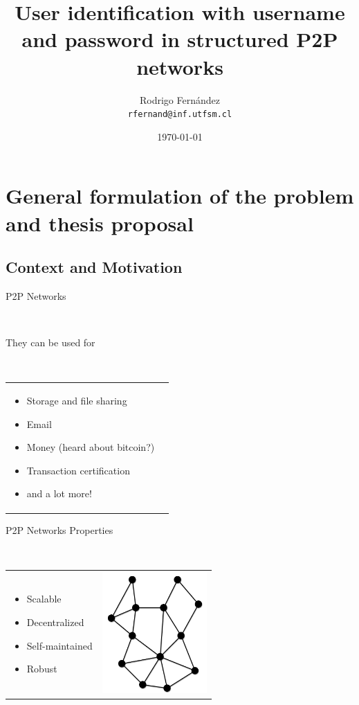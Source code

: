 \documentclass[12pt]{beamer}
\title{User identification with username and password in structured P2P networks}
\subtitle{}
\author[R. Fernández]{Rodrigo Fernández \\ \small{\texttt{rfernand@inf.utfsm.cl}}}
\institute[]{Universidad Técnica Federico Santa María}
\date{\today}
\renewcommand{\frametitle}[1]{\vspace{0.2cm}\begin{huge}#1\end{huge}\\}
\renewcommand{\framesubtitle}[1]{\vspace{0.4cm} \hspace{0.4cm}\begin{large}#1\end{large}\\}
\begin{document}
  

  \frame{\titlepage}
  \frame{\tableofcontents}

  \section{General formulation of the problem and thesis proposal}
  \subsection{Context and Motivation}

  \begin{frame}
  \frametitle{P2P Networks}
  \framesubtitle{They can be used for}
  
  \begin{table}
  \begin{tabular}{p{7cm}p{3cm}}
  \begin{itemize}
    \item Storage and file sharing
    \item Email
    \item Money (heard about bitcoin?)
    \item Transaction certification
    \item and a lot more!
  \end{itemize}
  &
  \vspace{1.5cm}
  \end{tabular}
  \end{table}
  \end{frame}

    \begin{frame}
    \frametitle{P2P Networks Properties}
    \begin{table}
    \begin{tabular}{p{7cm}p{3cm}}
    \begin{itemize}
      \item Scalable
      \item Decentralized
      \item Self-maintained
      \item Robust
    \end{itemize}
    &
    \vspace{1.5cm}
    \includegraphics[width=4cm]{../../presentacion/img/p2p-unstructured}\\
    \end{tabular}
    \end{table}
    \end{frame}
    
\end{document}
